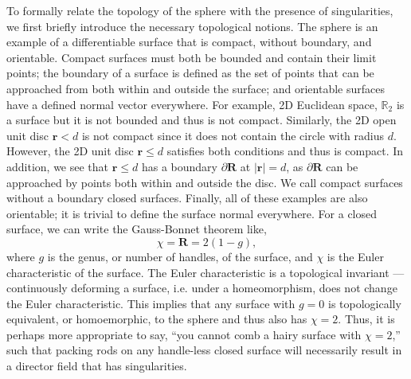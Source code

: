 To formally relate the topology of the sphere with the presence of singularities, we first briefly introduce the necessary topological notions.
The sphere is an example of a differentiable surface that is compact, without boundary, and orientable.
Compact surfaces must both be bounded and contain their limit points; the boundary of a surface is defined as the set of points that can be approached from both within and outside the surface; and orientable surfaces have a defined normal vector everywhere.
For example, 2D Euclidean space, $\mathbb{R}_2$ is a surface but it is not bounded and thus is not compact.
Similarly, the 2D open unit disc $\mathbf{r} < d$ is not compact since it does not contain the circle with radius $d$.
However, the 2D unit disc $\mathbf{r} \leq d$ satisfies both conditions and thus is compact.
In addition, we see that $\mathbf{r} \leq d$ has a boundary $\partial \mathbf{R}$ at $|\mathbf{r}| = d$, as $\partial \mathbf{R}$ can be approached by points both within and outside the disc.
We call compact surfaces without a boundary closed surfaces.
Finally, all of these examples are also orientable; it is trivial to define the surface normal everywhere.
For a closed surface, we can write the Gauss-Bonnet theorem like,
\begin{equation}
  \chi = \mathbf{R} = 2(1-g),\label{e:1-GB}
\end{equation}
where $g$ is the genus, or number of handles, of the surface, and $\chi$ is the Euler characteristic of the surface.
The Euler characteristic is a topological invariant --- continuously deforming a surface, i.e. under a homeomorphism, does not change the Euler characteristic.
This implies that any surface with $g=0$ is topologically equivalent, or homoemorphic, to the sphere and thus also has $\chi=2$.
Thus, it is perhaps more appropriate to say, ``you cannot comb a hairy surface with $\chi=2$,'' such that packing rods on any handle-less closed surface will necessarily result in a director field that has singularities.

